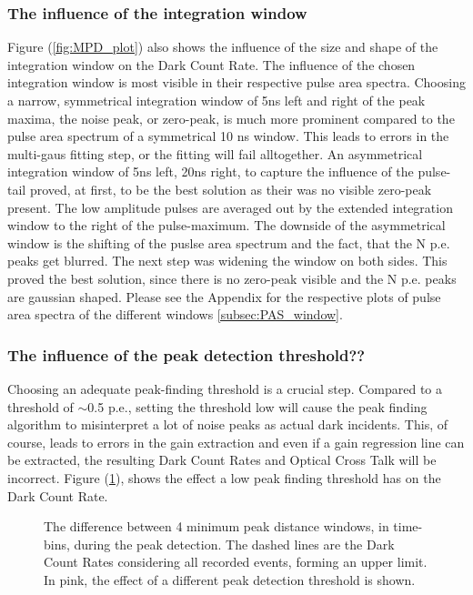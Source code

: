 \documentclass[12pt,article,type=msc,colorback,accentcolor=tud9c]{tudthesis}
\begin{document}
\subsubsection{The influence of the integration window}
Figure (\ref{fig:MPD_plot}) also shows the influence of the size and shape of the integration window on the Dark Count Rate. The influence of the chosen integration window is most visible in their respective pulse area spectra. Choosing a narrow, symmetrical integration window of 5ns left and right of the peak maxima, the noise peak, or zero-peak, is much more prominent compared to the pulse area spectrum of a symmetrical 10 ns window. This leads to errors in the multi-gaus fitting step, or the fitting will fail alltogether. An asymmetrical integration window of 5ns left, 20ns right, to capture the influence of the pulse-tail proved, at first, to be the best solution as their was no visible zero-peak present. The low amplitude pulses are averaged out by the extended integration window to the right of the pulse-maximum. The downside of the asymmetrical window is the shifting of the puslse area spectrum and the fact, that the N p.e. peaks get blurred. The next step was widening the window on both sides. This proved the best solution, since there is no zero-peak visible and the N p.e. peaks are gaussian shaped. Please see the Appendix for the respective plots of pulse area spectra of the different windows \ref{subsec:PAS_window}.

\subsubsection{The influence of the peak detection threshold??}

Choosing an adequate peak-finding threshold is a crucial step. Compared to a threshold of $\sim$0.5 p.e., setting the threshold low will cause the peak finding algorithm to misinterpret a lot of noise peaks as actual dark incidents. This, of course, leads to errors in the gain extraction and even if a gain regression line can be extracted, the resulting Dark Count Rates and Optical Cross Talk will be incorrect. Figure (\ref{fig:PF_Thresh_plot}), shows the effect a low peak finding threshold has on the Dark Count Rate.

\begin{figure}[h]
\begin{centering}
\caption{The difference between 4 minimum peak distance windows, in time-bins, during the peak detection. The dashed lines are the Dark Count Rates considering all recorded events, forming an upper limit. In pink, the effect of a different peak detection threshold is shown.}
\label{fig:PF_Thresh_plot}
\end{centering}
\end{figure}
\end{document}

